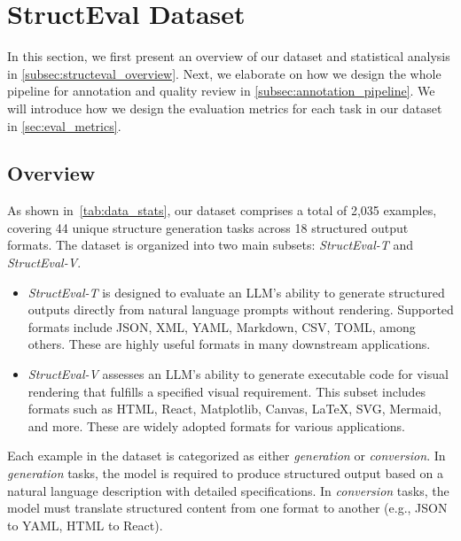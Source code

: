 
\section{StructEval Dataset}
\label{sec:structeval}
In this section, we first present an overview of our \structeval dataset and statistical analysis in \autoref{subsec:structeval_overview}. Next, we elaborate on how we design the whole pipeline for annotation and quality review in \autoref{subsec:annotation_pipeline}. We will introduce how we design the evaluation metrics for each task in our dataset in \autoref{sec:eval_metrics}.



\subsection{Overview}
\label{subsec:structeval_overview}

As shown in~\autoref{tab:data_stats}, our \structeval dataset comprises a total of 2,035 examples, covering 44 unique structure generation tasks across 18 structured output formats. The dataset is organized into two main subsets: \emph{StructEval-T} and \emph{StructEval-V}. 

\begin{itemize}
    \item \emph{StructEval-T} is designed to evaluate an LLM’s ability to generate structured outputs directly from natural language prompts without rendering. Supported formats include JSON, XML, YAML, Markdown, CSV, TOML, among others. These are highly useful formats in many downstream applications. 
    \item \emph{StructEval-V} assesses an LLM’s ability to generate executable code for visual rendering that fulfills a specified visual requirement. This subset includes formats such as HTML, React, Matplotlib, Canvas, LaTeX, SVG, Mermaid, and more. These are widely adopted formats for various applications. 
\end{itemize}



Each example in the dataset is categorized as either \textit{generation} or \textit{conversion}. In \textit{generation} tasks, the model is required to produce structured output based on a natural language description with detailed specifications. In \textit{conversion} tasks, the model must translate structured content from one format to another (e.g., JSON to YAML, HTML to React).

